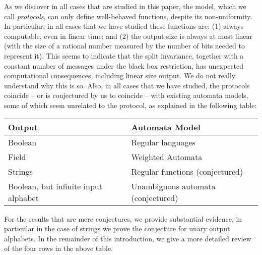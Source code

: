 As we discover in all cases that are studied in this paper, the model, which we call \emph{protocols}, can only define well-behaved functions, despite its non-uniformity. In particular, in all cases that we have studied  these functions are: (1)  always  computable, even in linear time; and (2) the output size is always at most linear (with the size of a rational number measured by the number of bits needed to represent it).  This seems to indicate that the split invariance, together with a  constant number of messages under the black box restriction, has unexpected computational consequences, including linear size output. We do not really understand why this is so.
Also, in all cases that we have studied,  the protocols coincide -- or is conjectured by us to coincide -- with existing automata models, some of which seem unrelated to the protocol, as explained in the following table: 
\begin{center}
    \begin{tabular}{ll}
    \textbf{Output} & \textbf{Automata Model} \\
    \hline
    Boolean & Regular languages \\
    Field & Weighted Automata \\
    Strings & Regular functions (conjectured) \\
    Boolean, but infinite input alphabet & Unambiguous  automata (conjectured) 
\end{tabular}
\end{center}
For the results that are mere conjectures, we provide substantial evidence, in particular in the case of strings we prove the conjecture for unary output alphabets. In the remainder of this introduction, we give a more detailed review of the four rows in the above table. 
